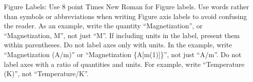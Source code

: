 \documentclass[conference]{IEEEtran}
\begin{document}
Figure Labels: Use 8 point Times New Roman for Figure labels. Use words 
rather than symbols or abbreviations when writing Figure axis labels to 
avoid confusing the reader. As an example, write the quantity 
``Magnetization'', or ``Magnetization, M'', not just ``M''. If including 
units in the label, present them within parentheses. Do not label axes only 
with units. In the example, write ``Magnetization (A/m)'' or ``Magnetization 
\{A[m(1)]\}'', not just ``A/m''. Do not label axes with a ratio of 
quantities and units. For example, write ``Temperature (K)'', not 
``Temperature/K''.





\end{document}
